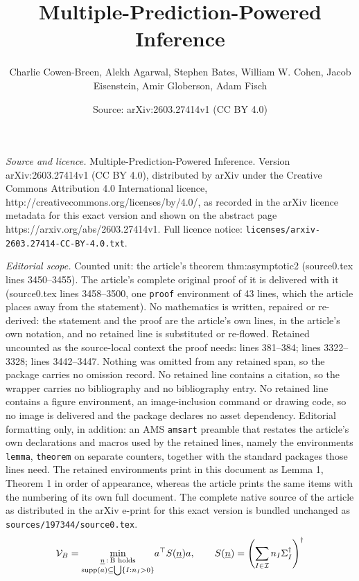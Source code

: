\documentclass[10pt,a4paper]{amsart}
\title{Multiple-Prediction-Powered Inference}
\author{Charlie Cowen-Breen, Alekh Agarwal, Stephen Bates, William W. Cohen, Jacob Eisenstein, Amir Globerson, Adam Fisch}
\date{Source: arXiv:2603.27414v1 (CC BY 4.0)}
\DeclareMathOperator{\supp}{supp}
\newcommand{\ul}[1]{\underline{#1}}
\begin{document}
\maketitle

\noindent\emph{Source and licence.} Multiple-Prediction-Powered Inference. Version arXiv:2603.27414v1 (CC BY 4.0), distributed by arXiv under the Creative Commons Attribution 4.0 International licence, http://creativecommons.org/licenses/by/4.0/, as recorded in the arXiv licence metadata for this exact version and shown on the abstract page https://arxiv.org/abs/2603.27414v1. Full licence notice: \texttt{licenses/arxiv-2603.27414-CC-BY-4.0.txt}.\par\smallskip

\noindent\textit{Editorial scope.} Counted unit: the article's theorem thm:asymptotic2 (source0.tex lines 3450--3455). The article's complete original proof of it is delivered with it (source0.tex lines 3458--3500, one \texttt{proof} environment of 43 lines, which the article places away from the statement). No mathematics is written, repaired or re-derived: the statement and the proof are the article's own lines, in the article's own notation, and no retained line is substituted or re-flowed.  Retained uncounted as the source-local context the proof needs: lines 381--384; lines 3322--3328; lines 3442--3447.  Nothing was omitted from any retained span, so the package carries no omission record.  No retained line contains a citation, so the wrapper carries no bibliography and no bibliography entry.  No retained line contains a figure environment, an image-inclusion command or drawing code, so no image is delivered and the package declares no asset dependency.  Editorial formatting only, in addition: an AMS \texttt{amsart} preamble that restates the article's own declarations and macros used by the retained lines, namely the environments \texttt{lemma}, \texttt{theorem} on separate counters, together with the standard packages those lines need.  The retained environments print in this document as Lemma 1, Theorem 1 in order of appearance, whereas the article prints the same items with the numbering of its own full document.  The complete native source of the article as distributed in the arXiv e-print for this exact version is bundled unchanged as \texttt{sources/197344/source0.tex}.
\begin{equation}
    \label{eq:variance}
    \mathcal{V}_B=\underset{\substack{\ul{n}\,:\,\text{\textbf{B} holds} \\ \supp(a)\subseteq\bigcup\{I:n_I>0\}}}{\min} a^\top S(\ul{n}) a,\quad\quad S(\ul{n})=\left(\sum_{I\in\mathcal{I}} n_I \Sigma_I^\dagger\right)^\dagger
\end{equation}
\end{document}
